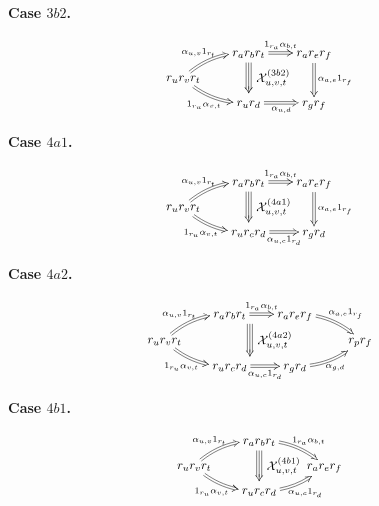 \documentclass[a4paper, twoside, 11pt, english]{article}
\newcommand{\caseconfluence}[1]{%
\[
\scalebox{0.9}{$#1$}
\]
}
\begin{document}
\noindent
\begin{minipage}[t]{0.49\textwidth}
\centering
\textbf{Case $3b2$.}

\caseconfluence{
\xymatrix @R=0.75em @C=1.8em @!C {
        & r_a r_b r_t
        \ar@2[r]^-{1_{r_a}\alpha_{b,t}}
        \ar@3[]!<0pt,-8pt>;[dd]!<0pt,8pt>
          ^-*+{\mathcal X^{(3b2)}_{u,v,t}}
        & r_a r_e r_f
        \ar@2[dd]^-{\alpha_{a,e}1_{r_f}}
        \\
r_u r_v r_t
        \ar@2@/^/[ur]^-{\alpha_{u,v}1_{r_t}}
        \ar@2@/_/[dr]_-{1_{r_u}\alpha_{v,t}}
        \\
        & r_u r_d
        \ar@2[r]_-{\alpha_{u,d}}
        & r_g r_f
}
}
\end{minipage}
\hfill
\begin{minipage}[t]{0.49\textwidth}
\centering
\textbf{Case $4a1$.}

\caseconfluence{
\xymatrix @R=0.75em @C=1.8em @!C {
        & r_a r_b r_t
        \ar@2[r]^-{1_{r_a}\alpha_{b,t}}
        \ar@3[]!<0pt,-8pt>;[dd]!<0pt,8pt>
          ^-*+{\mathcal X^{(4a1)}_{u,v,t}}
        & r_a r_e r_f
        \ar@2[dd]^-{\alpha_{a,e}1_{r_f}}
        \\
r_u r_v r_t
        \ar@2@/^/[ur]^-{\alpha_{u,v}1_{r_t}}
        \ar@2@/_/[dr]_-{1_{r_u}\alpha_{v,t}}
        \\
        & r_u r_c r_d
        \ar@2[r]_-{\alpha_{u,c}1_{r_d}}
        & r_g r_d
}
}
\end{minipage}

\medskip

\noindent
\begin{minipage}[t]{0.49\textwidth}
\centering
\textbf{Case $4a2$.}

\caseconfluence{
\xymatrix @R=0.75em @C=1.8em @!C {
        & r_a r_b r_t
        \ar@2[r]^-{1_{r_a}\alpha_{b,t}}
        \ar@3[]!<16pt,-8pt>;[dd]!<16pt,8pt>
          ^-*+{\mathcal X^{(4a2)}_{u,v,t}}
        & r_a r_e r_f
        \ar@2@/^/[dr]^-{\alpha_{a,e}1_{r_f}}
        \\
r_u r_v r_t
        \ar@2@/^/[ur]^-{\alpha_{u,v}1_{r_t}}
        \ar@2@/_/[dr]_-{1_{r_u}\alpha_{v,t}}
        &&& r_p r_f
        \\
        & r_u r_c r_d
        \ar@2[r]_-{\alpha_{u,c}1_{r_d}}
        & r_g r_d
        \ar@2@/_/[ur]_-{\alpha_{g,d}}
}
}
\end{minipage}
\hfill
\begin{minipage}[t]{0.49\textwidth}
\centering
\textbf{Case $4b1$.}

\caseconfluence{
\xymatrix @R=0.75em @C=1.8em @!C {
        & r_a r_b r_t
        \ar@2@/^/[dr]^-{1_{r_a}\alpha_{b,t}}
        \ar@3[]!<0pt,-8pt>;[dd]!<0pt,8pt>
          ^-*+{\mathcal X^{(4b1)}_{u,v,t}}
        \\
r_u r_v r_t
        \ar@2@/^/[ur]^-{\alpha_{u,v}1_{r_t}}
        \ar@2@/_/[dr]_-{1_{r_u}\alpha_{v,t}}
        && r_a r_e r_f
        \\
        & r_u r_c r_d
        \ar@2@/_/[ur]_-{\alpha_{u,c}1_{r_d}}
}
}
\end{minipage}
\end{document}
